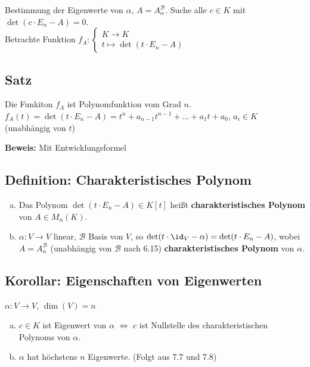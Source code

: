   Bestimmung der Eigenwerte von $\alpha$, $A=A_\alpha^{\mathcal{B}}$. Suche alle $c\in
  K$ mit $\det(c\cdot E_n-A)=0$.\\
  Betrachte Funktion $f_A:\begin{cases}K\rightarrow K\\t\mapsto\det(t\cdot
  E_n-A)\end{cases}$

\subsection{Satz}
  Die Funkiton $f_A$ ist Polynomfunktion vom Grad $n$.\\
  $f_A(t)=\det(t\cdot E_n-A)=t^n+a_{n-1}t^{n-1}+...+a_1t+a_0$, $a_i\in K$
  (unabhängig von $t$)

  \textbf{Beweis:} Mit Entwicklungsformel

\subsection{Definition: Charakteristisches Polynom}
  \begin{enumerate}[a)]
    \item Das Polynom $\det(t\cdot E_n-A)\in K[t]$ heißt
      \textbf{charakteristisches Polynom} von $A\in M_n(K)$.
    \item $\alpha:V\rightarrow V$ linear, $\mathcal{B}$ Basis von $V$, so
      $\det(t\cdot\id_V-\alpha)=\det(t\cdot E_n-A)$, wobei
      $A=A_\alpha^{\mathcal{B}}$ (unabhängig von ${\mathcal{B}}$ nach 6.15)
      \textbf{charakteristisches Polynom} von $\alpha$.
  \end{enumerate}

\subsection{Korollar: Eigenschaften von Eigenwerten}
  $\alpha:V\rightarrow V$, $\dim(V)=n$
  \begin{enumerate}[a)]
    \item $c\in K$ ist Eigenwert von $\alpha$ $\Leftrightarrow$ $c$ ist
      Nullstelle des charakteristischen Polynoms von $\alpha$.
    \item $\alpha$ hat höchstens $n$ Eigenwerte. (Folgt aus 7.7 und 7.8)
  \end{enumerate}

